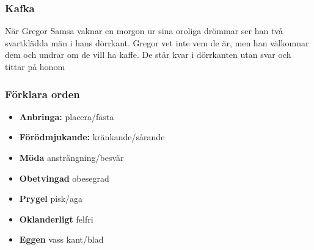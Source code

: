 \subsubsection{Kafka}
När Gregor Samsa vaknar en morgon ur sina oroliga drömmar ser han två svartklädda män i hans dörrkant. Gregor vet inte vem de är, men han välkomnar dem och undrar om de vill ha kaffe. De står kvar i dörrkanten utan svar och tittar på honom

\subsubsection{Förklara orden}
\begin{itemize}
	\item \textbf{Anbringa:} placera/fästa
	\item \textbf{Förödmjukande:} kränkande/sårande
	\item \textbf{Möda} ansträngning/besvär
	\item \textbf{Obetvingad} obesegrad
	\item \textbf{Prygel} pisk/aga
	\item \textbf{Oklanderligt} felfri
	\item \textbf{Eggen} vass kant/blad
\end{itemize}
























